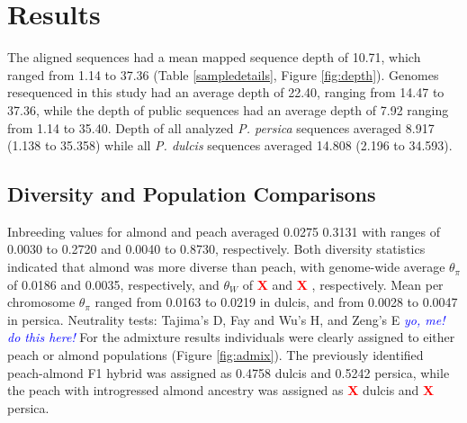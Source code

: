 \documentclass[12pt]{article}
\newcommand{\X}{\textcolor{red}{\bf X }}
\newcommand{\dv}[1]{\textcolor{blue}{\emph{#1}}}
\begin{document}
\section*{Results}

The aligned sequences had a mean mapped sequence depth of 10.71, which ranged from 1.14 to 37.36 (Table \ref{sampledetails}, Figure \ref{fig:depth}). %
%
Genomes resequenced in this study had an average depth of 22.40, ranging from 14.47 to 37.36, while the depth of public sequences had an average depth of 7.92 ranging from 1.14 to 35.40.
%
Depth of all analyzed \emph{P. persica} sequences averaged 8.917 (1.138 to 35.358) while all \emph{P. dulcis} sequences averaged 14.808 (2.196 to 34.593).
%
\subsection*{Diversity and Population Comparisons}

Inbreeding values for almond and peach averaged 0.0275 0.3131 with ranges of 0.0030 to 0.2720 and 0.0040 to 0.8730, respectively.
%
Both diversity statistics indicated that almond was more diverse than peach, with genome-wide average $\theta_{\pi}$ of 0.0186 and 0.0035, respectively, and $\theta_{W}$ of \X and \X, respectively. %
%
Mean per chromosome $\theta_{\pi}$ ranged from 0.0163 to 0.0219 in dulcis, and from 0.0028 to 0.0047 in persica.
%
Neutrality tests: Tajima's D, Fay and Wu's H, and Zeng's E \dv{yo, me! do this here!}
%
For the admixture results individuals were clearly assigned to either peach or almond populations (Figure \ref{fig:admix}). 
%
The previously identified peach-almond F1 hybrid was assigned as 0.4758 dulcis and 0.5242 persica, while the peach with introgressed almond ancestry was assigned as \X dulcis and \X persica.
%
\end{document}
